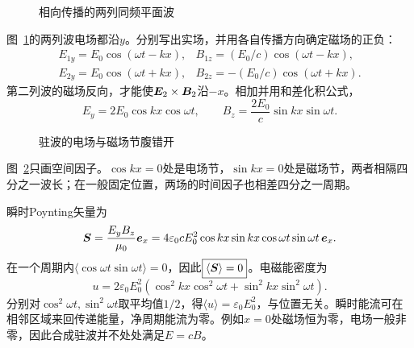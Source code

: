 \begin{figure}[H]\centering
{}
\caption{相向传播的两列同频平面波}\label{fig:i4-h6-q}
\end{figure}
\begin{solution}
图~\ref{fig:i4-h6-q}的两列波电场都沿$y$。分别写出实场，并用各自传播方向确定磁场的正负：
\[
\begin{array}{ll}
E_{1y}=E_0\cos(\omega t-kx),&
B_{1z}=(E_0/c)\cos(\omega t-kx),\\
E_{2y}=E_0\cos(\omega t+kx),&
B_{2z}=-(E_0/c)\cos(\omega t+kx).
\end{array}
\]
第二列波的磁场反向，才能使$\bm{E}_2\times\bm{B}_2$沿$-x$。相加并用和差化积公式，
\[
\boxed{E_y=2E_0\cos kx\cos\omega t},\qquad
\boxed{B_z=\frac{2E_0}{c}\sin kx\sin\omega t}.
\]
\begin{figure}[H]\centering
{}
\caption{驻波的电场与磁场节腹错开}\label{fig:i4-h6-s}
\end{figure}
图~\ref{fig:i4-h6-s}只画空间因子。$\cos kx=0$处是电场节，$\sin kx=0$处是磁场节，两者相隔四分之一波长；在一般固定位置，两场的时间因子也相差四分之一周期。

瞬时Poynting矢量为
\[
\bm{S}=\frac{E_yB_z}{\mu_0}\bm{e}_x
=4\varepsilon_0cE_0^2\cos kx\sin kx
\cos\omega t\sin\omega t\,\bm{e}_x.
\]
在一个周期内$\langle\cos\omega t\sin\omega t\rangle=0$，因此$\boxed{\langle\bm{S}\rangle=0}$。电磁能密度为
\[
u=2\varepsilon_0E_0^2
(\cos^2kx\cos^2\omega t+\sin^2kx\sin^2\omega t).
\]
分别对$\cos^2\omega t,\sin^2\omega t$取平均值$1/2$，得$\langle u\rangle=\varepsilon_0E_0^2$，与位置无关。瞬时能流可在相邻区域来回传递能量，净周期能流为零。例如$x=0$处磁场恒为零，电场一般非零，因此合成驻波并不处处满足$E=cB$。
\end{solution}


